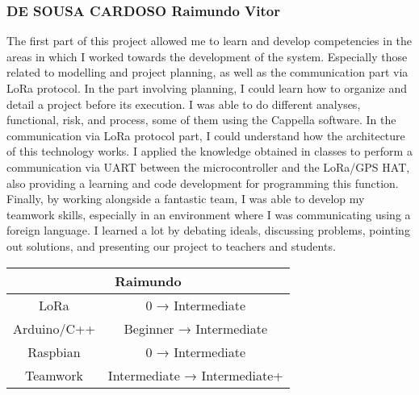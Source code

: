 \newpage
\subsubsection*{DE SOUSA CARDOSO Raimundo Vitor}
The first part of this project allowed me to learn and develop competencies in the areas in which I worked towards the development of the system. Especially those related to modelling and project planning, as well as the communication part via LoRa protocol.
In the part involving planning, I could learn how to organize and detail a project before its execution. I was able to do different analyses, functional, risk, and process, some of them using the Cappella software. 
In the communication via LoRa protocol part, I could understand how the architecture of this technology works. I applied the knowledge obtained in classes to perform a communication via UART between the microcontroller and the LoRa/GPS HAT, also providing a learning and code development for programming this function.
Finally, by working alongside a fantastic team, I was able to develop my teamwork skills, especially in an environment where I was communicating using a foreign language. I learned a lot by debating ideals, discussing problems, pointing out solutions, and presenting our project to teachers and students.



\begin{table}[!h]
    \centering
    \begin{tabular}{|cc|}
    \hline
    \multicolumn{2}{|c|}{\cellcolor[HTML]{32CB00}Raimundo}           \\ \hline
    \multicolumn{1}{|c|}{LoRa}        & 0 →  Intermediate            \\ \hline
    \multicolumn{1}{|c|}{Arduino/C++} & Beginner → Intermediate      \\ \hline
    \multicolumn{1}{|c|}{Raspbian}    & 0 → Intermediate             \\ \hline
    \multicolumn{1}{|c|}{Teamwork}    & Intermediate → Intermediate+ \\ \hline
    \end{tabular}
\end{table}